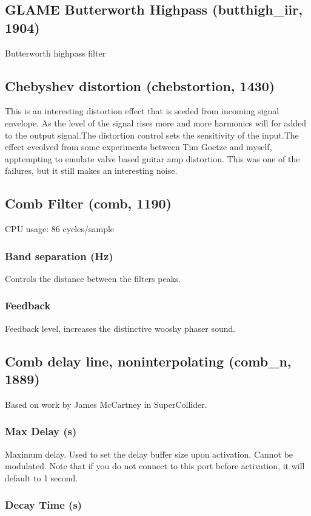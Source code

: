 \documentclass[11pt]{article}
\begin{document}
                \subsection{GLAME Butterworth Highpass (butthigh\_iir, 1904)\label{butthigh_iir}\label{id1904}}
 Butterworth highpass filter
                \subsection{Chebyshev distortion (chebstortion, 1430)\label{chebstortion}\label{id1430}}
This is an interesting distortion effect that is seeded from incoming
signal envelope. As the level of the signal rises more and more harmonics will
for added to the output signal.The distortion control sets the sensitivity of the input.The effect eveolved from some experiments between Tim Goetze and myself,
apptempting to emulate valve based guitar amp distortion. This was one of the
failures, but it still makes an interesting noise.\subsection{Comb Filter (comb, 1190)\label{comb}\label{id1190}}
CPU usage: 86 cycles/sample

\subsubsection*{Band separation (Hz)}
Controls the distance between the filters peaks.\subsubsection*{Feedback}
Feedback level, increases the distinctive wooshy phaser sound.\subsection{Comb delay line, noninterpolating (comb\_n, 1889)\label{comb_n}\label{id1889}}
Based on work by James McCartney in SuperCollider.\subsubsection*{Max Delay (s)}

       Maximum delay. Used to set the delay buffer size upon activation. Cannot
       be modulated. Note that if you do not connect to this port before
       activation, it will default to 1 second. 
      \subsubsection*{Decay Time (s)}
\end{document}
